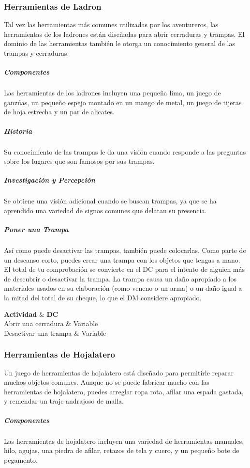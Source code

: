 \documentclass[a4paper,twocolumn,openany,10pt]{dndbook}
\begin{document}
\subsubsection*{Herramientas de Ladron}
Tal vez las herramientas más comunes utilizadas por los aventureros, las herramientas de los ladrones están diseñadas para abrir
cerraduras y trampas. El dominio de las herramientas también le otorga un conocimiento general de las trampas y cerraduras.

\subparagraph{Componentes} Las herramientas de los ladrones incluyen una pequeña lima, un juego de ganzúas, un pequeño espejo
montado en un mango de metal, un juego de tijeras de hoja estrecha y un par de alicates.

\subparagraph{Historia} Su conocimiento de las trampas le da una visión cuando responde a las preguntas sobre los lugares que son
famosos por sus trampas.

\subparagraph{Investigación y Percepción} Se obtiene una visión adicional cuando se buscan trampas, ya que se ha aprendido una
variedad de signos comunes que delatan su presencia.

\subparagraph{Poner una Trampa} Así como puede desactivar las trampas, también puede colocarlas. Como parte de un descanso corto,
puedes crear una trampa con los objetos que tengas a mano. El total de tu comprobación se convierte en el DC para el intento de
alguien más de descubrir o desactivar la trampa. La trampa causa un daño apropiado a los materiales usados en su elaboración
(como veneno o un arma) o un daño igual a la mitad del total de su cheque, lo que el DM considere apropiado.

\begin{dndtable}[Xc]
	\textbf{Actividad}		& \textbf{DC}	\\
	Abrir una cerradura		& Variable	\\
	Desactivar una trampa 	& Variable	\\
\end{dndtable}

\subsubsection*{Herramientas de Hojalatero}
Un juego de herramientas de hojalatero está diseñado para permitirle reparar muchos objetos comunes. Aunque no se puede fabricar
mucho con las herramientas de hojalatero, puedes arreglar ropa rota, afilar una espada gastada, y remendar un traje andrajoso de
malla.

\subparagraph{Componentes} Las herramientas de hojalatero incluyen una variedad de herramientas manuales, hilo, agujas, una
piedra de afilar, retazos de tela y cuero, y un pequeño bote de pegamento.
\end{document}
